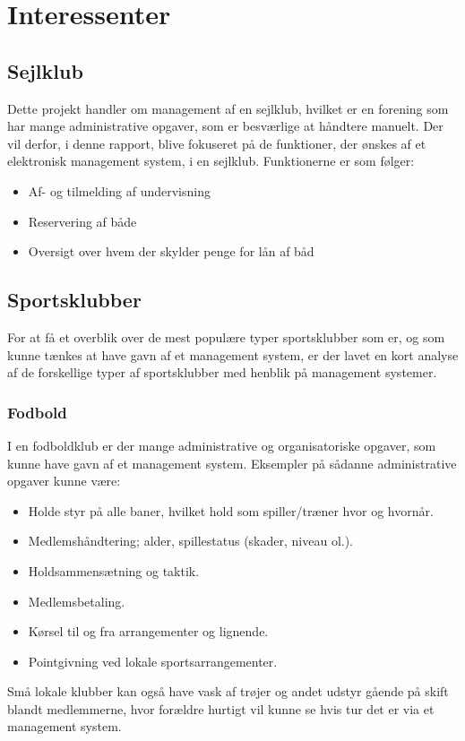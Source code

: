 \chapter{Interessenter}
\cbstart

\section{Sejlklub}\label{sec:sejlklub}
Dette projekt handler om management af en sejlklub, hvilket er en forening som har mange administrative opgaver, som er
besværlige at håndtere manuelt. Der vil derfor, i denne rapport, blive fokuseret på de funktioner, der ønskes af et
elektronisk management system, i en sejlklub. Funktionerne er som følger:

\begin{itemize}
\item Af- og tilmelding af undervisning
\item Reservering af både
\item Oversigt over hvem der skylder penge for lån af båd
\end{itemize}

\section{Sportsklubber}
For at få et overblik over de mest populære typer sportsklubber som er, og som kunne tænkes at have gavn af et management system, er der lavet en kort analyse af de forskellige typer af sportsklubber med henblik på management systemer. 

\subsection{Fodbold}
I en fodboldklub er der mange administrative og organisatoriske opgaver, som kunne have gavn af et management system. Eksempler på sådanne administrative opgaver kunne være:
\begin{itemize}
\item Holde styr på alle baner, hvilket hold som spiller/træner hvor og hvornår.
\item Medlemshåndtering; alder, spillestatus (skader, niveau ol.).
\item Holdsammensætning og taktik.
\item Medlemsbetaling.
\item Kørsel til og fra arrangementer og lignende.
\item Pointgivning ved lokale sportsarrangementer.
\end{itemize}
Små lokale klubber kan også have vask af trøjer og andet udstyr gående på skift blandt medlemmerne, hvor forældre hurtigt vil kunne se hvis tur det er via et management system. 

